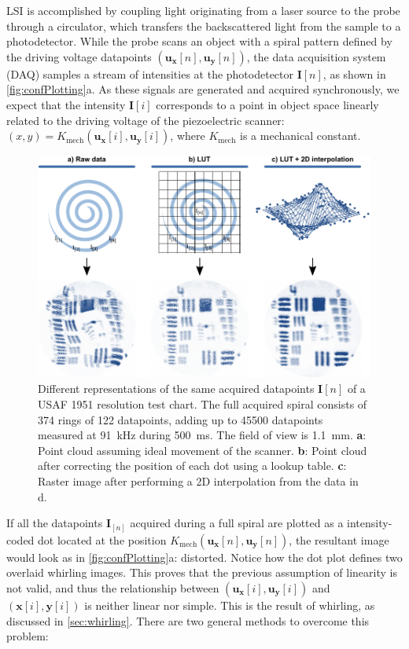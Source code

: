 \documentclass[10pt]{iopart}
\begin{document}
LSI is accomplished by coupling light originating from a laser source to the probe through a circulator, which transfers the backscattered light from the sample to a photodetector. While the probe scans an object with a spiral pattern defined by the driving voltage datapoints $(\mathbf{u_x}[n], \mathbf{u_y}[n])$, the data acquisition system (DAQ) samples a stream of intensities at the photodetector $\mathbf{I}[n]$, as shown in \autoref{fig:confPlotting}a. As these signals are generated and acquired synchronously, we expect that the intensity $\mathbf{I}[i]$ corresponds to a point in object space linearly related to the driving voltage of the piezoelectric scanner: $(x, y) = K_\mathrm{mech}(\mathbf{u_x}[i], \mathbf{u_y}[i])$, where $K_\mathrm{mech}$ is a mechanical constant.

\begin{figure}[h!]\centering \includegraphics[width=\columnwidth]{figures/Plotting.pdf}
      \caption{Different representations of the same acquired datapoints $\mathbf{I}[n]$ of a USAF 1951 resolution test chart. The full acquired spiral consists of 374 rings of 122 datapoints, adding up to 45500 datapoints measured at \SI{91}{\kilo\hertz} during \SI{500}{\milli\second}. The field of view is \SI{1.1}{\milli\meter}.
      \textbf{a}: Point cloud assuming ideal movement of the scanner.
      \textbf{b}: Point cloud after correcting the position of each dot using a lookup table.
      \textbf{c}: Raster image after performing a 2D interpolation from the data in d.}
      \label{fig:confPlotting}
\end{figure}

If all the datapoints $\mathbf{I}_{[n]}$ acquired during a full spiral are plotted as a intensity-coded dot located at the position $K_\mathrm{mech}(\mathbf{u_x}[n], \mathbf{u_y}[n])$, the resultant image would look as in \autoref{fig:confPlotting}a: distorted. Notice how the dot plot defines two overlaid whirling images. This proves that the previous assumption of linearity is not valid, and thus the relationship between $(\mathbf{u_x}[i], \mathbf{u_y}[i])$ and $(\mathbf{x}[i], \mathbf{y}[i])$ is neither linear nor simple. This is the result of whirling, as discussed in \autoref{sec:whirling}. There are two general methods to overcome this problem:
\end{document}
